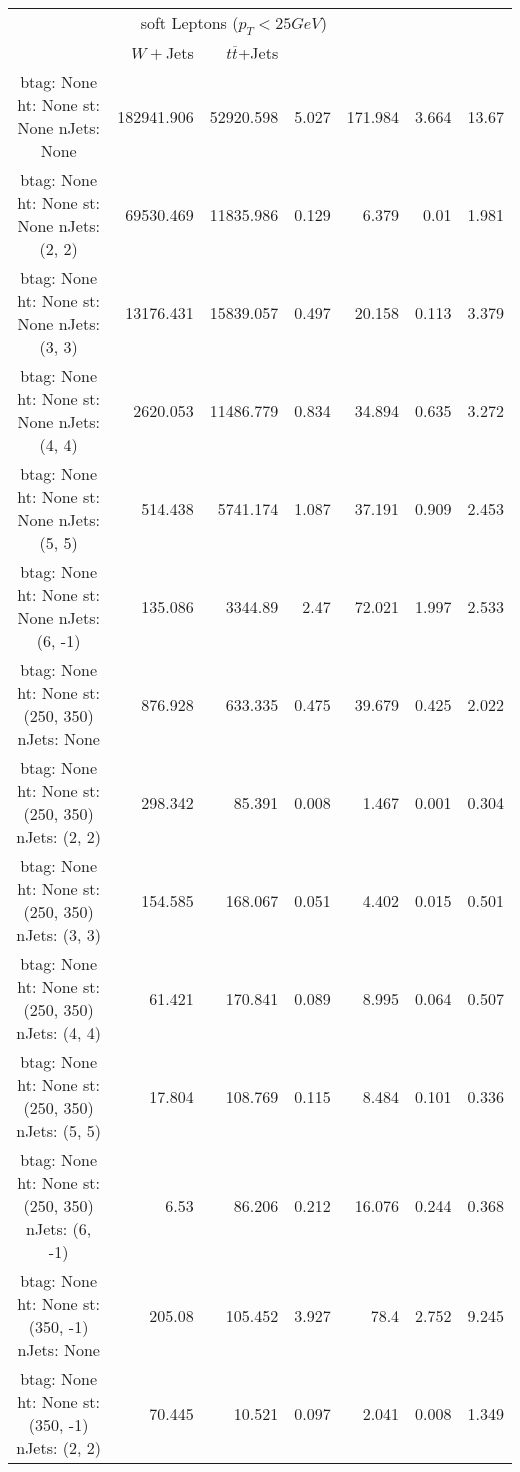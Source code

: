 \documentclass[12pt]{paper}
\begin{document}
\begin{landscape}
\begin{longtable}{c|r|r|r|r|r|r}
\multicolumn{6}{c}{soft Leptons ($p_{T}<25GeV$)}\\
 & $W+$Jets & $t\overline{t}$+Jets &&&&\\\hline%
btag:  None ht:  None st:  None nJets:  None
 & 182941.906 & 52920.598 & 5.027 & 171.984 & 3.664 & 13.67\\
btag:  None ht:  None st:  None nJets:  (2, 2)
 & 69530.469 & 11835.986 & 0.129 & 6.379 & 0.01 & 1.981\\
btag:  None ht:  None st:  None nJets:  (3, 3)
 & 13176.431 & 15839.057 & 0.497 & 20.158 & 0.113 & 3.379\\
btag:  None ht:  None st:  None nJets:  (4, 4)
 & 2620.053 & 11486.779 & 0.834 & 34.894 & 0.635 & 3.272\\
btag:  None ht:  None st:  None nJets:  (5, 5)
 & 514.438 & 5741.174 & 1.087 & 37.191 & 0.909 & 2.453\\
btag:  None ht:  None st:  None nJets:  (6, -1)
 & 135.086 & 3344.89 & 2.47 & 72.021 & 1.997 & 2.533\\
btag:  None ht:  None st:  (250, 350) nJets:  None
 & 876.928 & 633.335 & 0.475 & 39.679 & 0.425 & 2.022\\
btag:  None ht:  None st:  (250, 350) nJets:  (2, 2)
 & 298.342 & 85.391 & 0.008 & 1.467 & 0.001 & 0.304\\
btag:  None ht:  None st:  (250, 350) nJets:  (3, 3)
 & 154.585 & 168.067 & 0.051 & 4.402 & 0.015 & 0.501\\
btag:  None ht:  None st:  (250, 350) nJets:  (4, 4)
 & 61.421 & 170.841 & 0.089 & 8.995 & 0.064 & 0.507\\
btag:  None ht:  None st:  (250, 350) nJets:  (5, 5)
 & 17.804 & 108.769 & 0.115 & 8.484 & 0.101 & 0.336\\
btag:  None ht:  None st:  (250, 350) nJets:  (6, -1)
 & 6.53 & 86.206 & 0.212 & 16.076 & 0.244 & 0.368\\
btag:  None ht:  None st:  (350, -1) nJets:  None
 & 205.08 & 105.452 & 3.927 & 78.4 & 2.752 & 9.245\\
btag:  None ht:  None st:  (350, -1) nJets:  (2, 2)
 & 70.445 & 10.521 & 0.097 & 2.041 & 0.008 & 1.349\\

\end{longtable}
\end{landscape}
\end{document}
